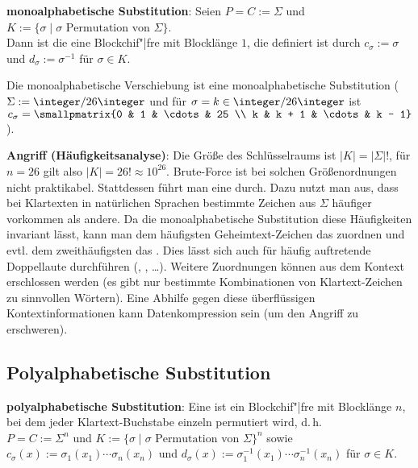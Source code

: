 \linie

\textbf{monoalphabetische Substitution}:
Seien $P = C := \Sigma$ und
$K := \{\sigma \;|\; \sigma \text{ Permutation von } \Sigma\}$.\\
Dann ist die  eine Blockchif"|fre mit Blocklänge $1$,
die definiert ist durch
$c_\sigma := \sigma$ und $d_\sigma := \sigma^{-1}$ für $\sigma \in K$.

Die monoalphabetische Verschiebung ist eine monoalphabetische Substitution
($\Sigma := \integer/26\integer$ und für $\sigma = k \in \integer/26\integer$ ist
$c_\sigma = \smallpmatrix{0 & 1 & \cdots & 25 \\ k & k + 1 & \cdots & k - 1}$).

\textbf{Angriff (Häufigkeitsanalyse)}:
Die Größe des Schlüsselraums ist $|K| = |\Sigma|!$, für $n = 26$ gilt also
$|K| = 26! \approx 10^{26}$.
Brute-Force ist bei solchen Größenordnungen nicht praktikabel.
Stattdessen führt man eine  durch.
Dazu nutzt man aus, dass bei Klartexten in natürlichen Sprachen bestimmte
Zeichen aus $\Sigma$ häufiger vorkommen als andere.
Da die monoalphabetische Substitution diese Häufigkeiten invariant lässt, kann man dem
häufigsten Geheimtext-Zeichen das  zuordnen und evtl. dem zweithäufigsten das .
Dies lässt sich auch für häufig auftretende Doppellaute durchführen (, , \dots).
Weitere Zuordnungen können aus dem Kontext erschlossen werden
(es gibt nur bestimmte Kombinationen von Klartext-Zeichen zu sinnvollen Wörtern).
Eine Abhilfe gegen diese überflüssigen Kontextinformationen kann Datenkompression sein
(um den Angriff zu erschweren).

\pagebreak

\subsection{%
    Polyalphabetische Substitution%
}

\textbf{polyalphabetische Substitution}:
Eine  ist ein Blockchif"|fre mit Blocklänge $n$,
bei dem jeder Klartext-Buchstabe einzeln permutiert wird, d.\,h.\\
$P = C := \Sigma^n$ und $K := \{\sigma \;|\; \sigma \text{ Permutation von } \Sigma\}^n$ sowie\\
$c_\sigma(x) := \sigma_1(x_1) \dotsb \sigma_n(x_n)$ und
$d_\sigma(x) := \sigma^{-1}_1(x_1) \dotsb \sigma^{-1}_n(x_n)$ für $\sigma \in K$.

